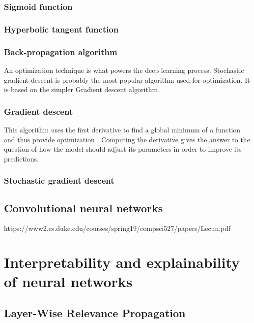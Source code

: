 \subsubsection*{Sigmoid function}


\subsubsection*{Hyperbolic tangent function}

\subsubsection{Back-propagation algorithm}
An optimization technique is what powers the deep learning process. Stochastic gradient descent is probably the most popular algorithm used for optimization. It is based on the simpler Gradient descent algorithm.
\subsubsection*{Gradient descent}
This algorithm uses the first derivative to find a global minimum of a function and thus provide optimization \cite{deeplearningbook}. Computing the derivative gives the answer to the question of how the model should adjust its parameters in order to improve its predictions.

\subsubsection*{Stochastic gradient descent}
\subsection{Convolutional neural networks}

https://www2.cs.duke.edu/courses/spring19/compsci527/papers/Lecun.pdf
\section{Interpretability and explainability of neural networks}
\subsection{Layer-Wise Relevance Propagation}
